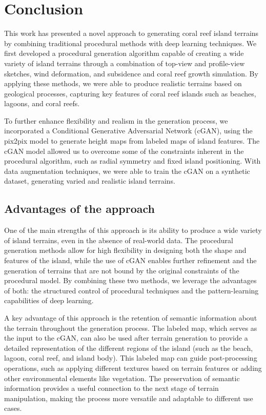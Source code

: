 \section{Conclusion}

This work has presented a novel approach to generating coral reef island terrains by combining traditional procedural methods with deep learning techniques. We first developed a procedural generation algorithm capable of creating a wide variety of island terrains through a combination of top-view and profile-view sketches, wind deformation, and subsidence and coral reef growth simulation. By applying these methods, we were able to produce realistic terrains based on geological processes, capturing key features of coral reef islands such as beaches, lagoons, and coral reefs.

To further enhance flexibility and realism in the generation process, we incorporated a Conditional Generative Adversarial Network (cGAN), using the pix2pix model to generate height maps from labeled maps of island features. The cGAN model allowed us to overcome some of the constraints inherent in the procedural algorithm, such as radial symmetry and fixed island positioning. With data augmentation techniques, we were able to train the cGAN on a synthetic dataset, generating varied and realistic island terrains.

\subsection{Advantages of the approach}

One of the main strengths of this approach is its ability to produce a wide variety of island terrains, even in the absence of real-world data. The procedural generation methods allow for high flexibility in designing both the shape and features of the island, while the use of cGAN enables further refinement and the generation of terrains that are not bound by the original constraints of the procedural model. By combining these two methods, we leverage the advantages of both: the structured control of procedural techniques and the pattern-learning capabilities of deep learning.

A key advantage of this approach is the retention of semantic information about the terrain throughout the generation process. The labeled map, which serves as the input to the cGAN, can also be used after terrain generation to provide a detailed representation of the different regions of the island (such as the beach, lagoon, coral reef, and island body). This labeled map can guide post-processing operations, such as applying different textures based on terrain features or adding other environmental elements like vegetation. The preservation of semantic information provides a useful connection to the next stage of terrain manipulation, making the process more versatile and adaptable to different use cases.

